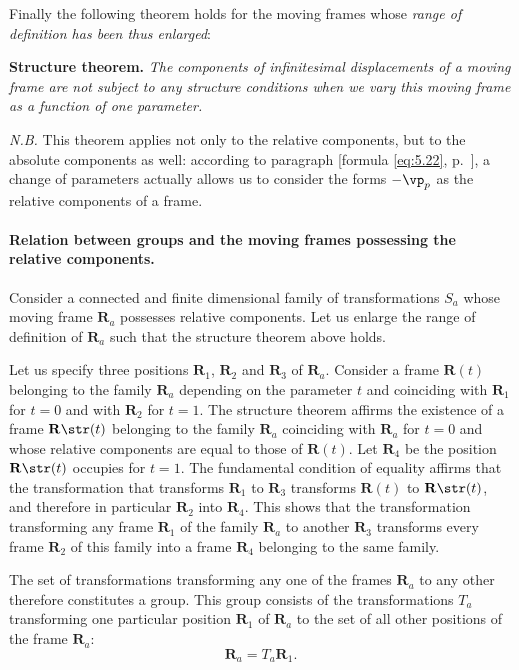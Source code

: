 Finally the following theorem holds for the moving frames whose \emph{range of definition has been thus enlarged}:

\somespace

\textbf{Structure theorem.} \emph{The components of infinitesimal displacements of a moving frame are not subject to any structure conditions when we vary this moving frame as a function of one parameter.}

\somespace

\emph{N.B.} This theorem applies not only to the relative components, but to the absolute components as well: according to paragraph  [formula \eqref{eq:5.22}, p.~\pageref{eq:5.22}], a change of parameters actually allows us to consider the forms $-\vp_{p}$ as the relative components of a frame.

\paragraph{Relation between groups and the moving frames possessing the relative components.}
\label{sec:78}
Consider a connected and finite dimensional family of transformations $S_{a}$ whose moving frame $\mathbf{R}_{a}$ possesses relative components. Let us enlarge the range of definition of $\mathbf{R}_{a}$ such that the structure theorem above holds.

Let us specify three positions $\mathbf{R}_{1}$, $\mathbf{R}_{2}$ and $\mathbf{R}_{3}$ of $\mathbf{R}_{a}$. Consider a frame $\mathbf{R}(t)$ belonging to the family $\mathbf{R}_{a}$ depending on the parameter $t$ and coinciding with $\mathbf{R}_{1}$ for $t=0$ and with $\mathbf{R}_{2}$ for $t=1$. The structure theorem affirms the existence of a frame $\mathbf{R}\str(t)$ belonging to the family $\mathbf{R}_{a}$ coinciding with $\mathbf{R}_{a}$ for $t=0$ and whose relative components are equal to those of $\mathbf{R}(t)$. Let $\mathbf{R}_{4}$ be the position $\mathbf{R}\str(t)$ occupies for $t=1$. The fundamental condition of equality affirms that the transformation that transforms $\mathbf{R}_{1}$ to $\mathbf{R}_{3}$ transforms $\mathbf{R}(t)$ to $\mathbf{R}\str(t)$, and therefore in particular $\mathbf{R}_{2}$ into $\mathbf{R}_{4}$. This shows that the transformation transforming any frame $\mathbf{R}_{1}$ of the family $\mathbf{R}_{a}$ to another $\mathbf{R}_{3}$ transforms every frame $\mathbf{R}_{2}$ of this family into a frame $\mathbf{R}_{4}$ belonging to the same family.

The set of transformations transforming any one of the frames $\mathbf{R}_{a}$ to any other therefore constitutes a group. This group consists of the transformations $T_{a}$ transforming one particular position $\mathbf{R}_{1}$ of $\mathbf{R}_{a}$ to the set of all other positions of the frame $\mathbf{R}_{a}$:
\begin{equation}
  \label{eq:5.24}
  \mathbf{R}_{a}=T_{a}\mathbf{R}_{1}.
\end{equation}

